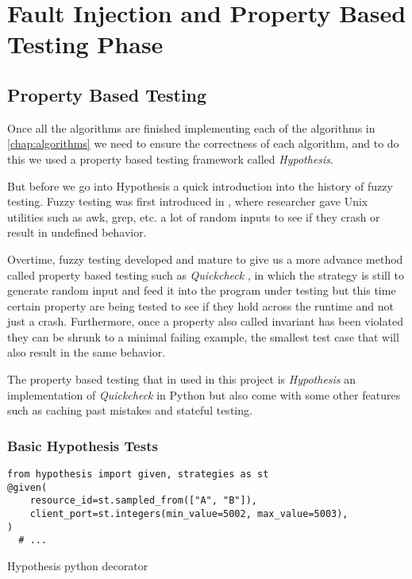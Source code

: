 \section{Fault Injection and Property Based Testing Phase}


\subsection{Property Based Testing}
Once all the algorithms are finished implementing each of the algorithms in 
\ref{chap:algorithms} we need to ensure the correctness of each algorithm, and to
do this we used a property based testing framework called \textit{Hypothesis}.

But before we go into Hypothesis a quick introduction into the history of fuzzy testing.
Fuzzy testing was first introduced in \cite{OG_fuzzy_testing}, where researcher
gave Unix utilities such as awk, grep, etc. a lot of random inputs to see if they crash or 
result in undefined behavior.

Overtime, fuzzy testing developed and mature to give us a more advance method called
property based testing such as \textit{Quickcheck} \cite{quickcheck}, in which the strategy is still 
to generate random input and feed it into the program under testing but this 
time certain property are being tested to see if they hold across the runtime 
and not just a crash. Furthermore, once a property also called invariant has 
been violated they can be shrunk to a minimal failing example, the smallest test 
case that will also result in the same behavior. 

The property based testing that in used in this project is \textit{Hypothesis} an
implementation of \textit{Quickcheck} in Python but also come with some other features
such as caching past mistakes and stateful testing.

\subsubsection{Basic Hypothesis Tests}
\label{subsubsec:basic_hypothesis_tests}


\begin{listing}[!ht]
  \begin{verbatim}
from hypothesis import given, strategies as st
@given(
    resource_id=st.sampled_from(["A", "B"]),
    client_port=st.integers(min_value=5002, max_value=5003),
)
  # ...
  \end{verbatim}
  \caption{Hypothesis python decorator}
  \label{code:hypothesis_decorator}
\end{listing}

